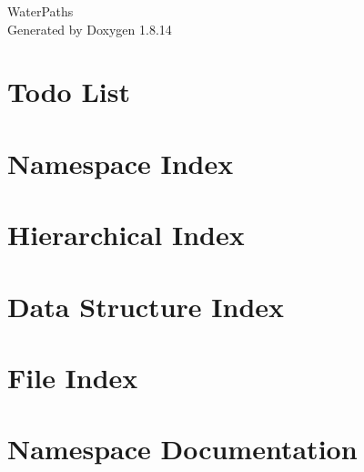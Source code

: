 \documentclass[twoside]{book}
\newcommand{\+}{\discretionary{\mbox{\scriptsize$\hookleftarrow$}}{}{}}
\newcommand{\clearemptydoublepage}{%
  \newpage{\pagestyle{empty}\cleardoublepage}%
}
\begin{document}
\hypersetup{pageanchor=false,
             bookmarksnumbered=true,
             pdfencoding=unicode
            }
\begin{titlepage}
\vspace*{7cm}
\begin{center}%
{\Large Water\+Paths }\\
\vspace*{1cm}
{\large Generated by Doxygen 1.8.14}\\
\end{center}
\end{titlepage}
\clearemptydoublepage
{}
\tableofcontents
\clearemptydoublepage
{}
\hypersetup{pageanchor=true}

\chapter{Todo List}
\label{todo}

\chapter{Namespace Index}

\chapter{Hierarchical Index}

\chapter{Data Structure Index}

\chapter{File Index}

\chapter{Namespace Documentation}


\end{document}
